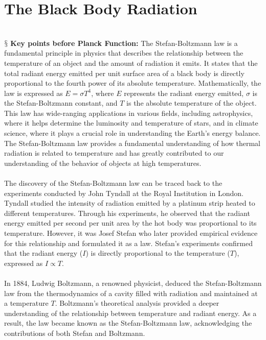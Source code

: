 \documentclass[9pt,a4paper, twocolumn]{article}
\newcounter{theo}
\newcommand{\newpoint}[1]{\ \\ \indent$\mathsection$ \textbf{#1}}
\begin{document}
    \section{The Black Body Radiation}
        \newpoint{Key points before Planck Function:} The Stefan-Boltzmann law is a fundamental principle in physics that describes the relationship between the temperature of an object and the amount of radiation it emits. It states that the total radiant energy emitted per unit surface area of a black body is directly proportional to the fourth power of its absolute temperature. Mathematically, the law is expressed as $E = \sigma T^4$, where $E$ represents the radiant energy emitted, $\sigma$ is the Stefan-Boltzmann constant, and $T$ is the absolute temperature of the object. This law has wide-ranging applications in various fields, including astrophysics, where it helps determine the luminosity and temperature of stars, and in climate science, where it plays a crucial role in understanding the Earth's energy balance. The Stefan-Boltzmann law provides a fundamental understanding of how thermal radiation is related to temperature and has greatly contributed to our understanding of the behavior of objects at high temperatures.
        \\
        \\
        The discovery of the Stefan-Boltzmann law can be traced back to the experiments conducted by John Tyndall at the Royal Institution in London. Tyndall studied the intensity of radiation emitted by a platinum strip heated to different temperatures. Through his experiments, he observed that the radiant energy emitted per second per unit area by the hot body was proportional to its temperature. However, it was Josef Stefan who later provided empirical evidence for this relationship and formulated it as a law. Stefan's experiments confirmed that the radiant energy ($I$) is directly proportional to the temperature ($T$), expressed as $I \propto T$.
        \\
        \\
        In 1884, Ludwig Boltzmann, a renowned physicist, deduced the Stefan-Boltzmann law from the thermodynamics of a cavity filled with radiation and maintained at a temperature $T$. Boltzmann's theoretical analysis provided a deeper understanding of the relationship between temperature and radiant energy. As a result, the law became known as the Stefan-Boltzmann law, acknowledging the contributions of both Stefan and Boltzmann.
        \\
        \\
\end{document}
